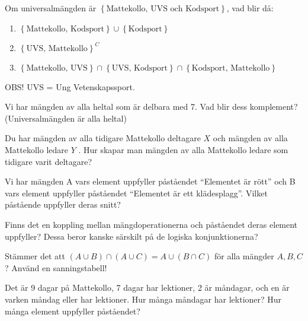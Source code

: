\begin{problem}
	Om universalmängden är \(\left\{\text{Mattekollo, UVS och Kodsport} \right\}\), vad blir då:
	\begin{enumerate}[label=\alph*)]
		\item \(\left\{\text{Mattekollo, Kodsport} \right\} \cup \left\{\text{Kodsport} \right\}\) 
		\item \(\left\{\text{UVS, Mattekollo}\right\}^C\) 
		\item \(\left\{\text{Mattekollo, UVS}\right\} \cap \left\{\text{UVS, Kodsport} \right\} \cap \left\{\text{Kodsport, Mattekollo} \right\}\) 
	\end{enumerate}
	
	OBS! UVS = Ung Vetenskapssport.
\end{problem}

\begin{problem}
	Vi har mängden av alla heltal som är delbara med 7. Vad blir dess komplement? (Universalmängden är alla heltal)
\end{problem}

\begin{problem}
	Du har mängden av alla tidigare Mattekollo deltagare \(X\)  och mängden av alla Mattekollo ledare \(Y\) . Hur skapar man mängden av alla Mattekollo ledare som tidigare varit deltagare?
\end{problem}

\begin{problem}
	Vi har mängden A vars element uppfyller påståendet ``Elementet är rött'' och B vars element uppfyller påståendet ``Elementet är ett klädesplagg''. Vilket påstående uppfyller deras snitt?
\end{problem}

\begin{problem}
	Finns det en koppling mellan mängdoperationerna och påståendet deras element uppfyller? Dessa beror kanske särskilt på de logiska konjunktionerna?
\end{problem}

\begin{problem}
	Stämmer det att \((A \cup B) \cap (A \cup C) = A \cup (B \cap C)\) för alla mängder \(A, B, C\)? Använd en sanningstabell!
\end{problem}

\begin{problem}[Extra]
	Det är 9 dagar på Mattekollo, 7 dagar har lektioner, 2 är måndagar, och en är varken måndag eller har lektioner. Hur många måndagar har lektioner?
	Hur många element uppfyller påståendet?
\end{problem}


